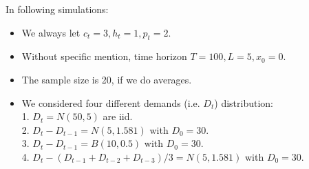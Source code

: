 \documentclass[twoside]{article}
\begin{document}
\begin{multicols}{2}
In following simulations:
    \begin{itemize}
      \item We always let $c_t = 3, h_t = 1, p_t = 2$.
      \item Without specific mention, time horizon $T = 100, L = 5, x_0 = 0$.
      \item The sample size is 20, if we do averages.
      \item We considered four different demands (i.e. $D_t$) distribution:\\
            1. $D_t = N(50,5)$ are iid.\\
            2. $D_t-D_{t-1} = N(5,1.581)$ with $D_0=30$.\\
            3. $D_t-D_{t-1} = B(10,0.5)$ with $D_0=30$.\\
            4. $D_t- (D_{t-1} + D_{t-2} + D_{t-3})/3 = N(5,1.581)$ with $D_0=30$.
    \end{itemize}


\end{multicols}
\end{document}
